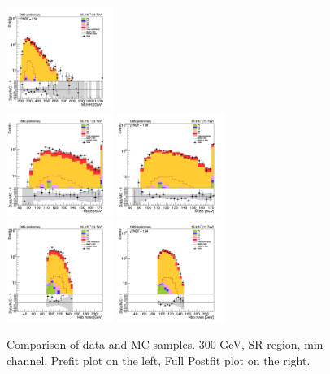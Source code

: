 \begin{figure}[tbp]
\begin{center}
    \includegraphics[width=0.31\textwidth]{figures/mm_300_SR_april21/hhMt_mm_SR_FullPostfit_plot_apr21.png}\\
    \includegraphics[width=0.31\textwidth]{figures/mm_300_SR_april21/hmass0_mm_SR_prefit_plot_apr21.png}
    \includegraphics[width=0.31\textwidth]{figures/mm_300_SR_april21/hmass0_mm_SR_FullPostfit_plot_apr21.png}\\
    \includegraphics[width=0.31\textwidth]{figures/mm_300_SR_april21/hmass1_mm_SR_prefit_plot_apr21.png}
    \includegraphics[width=0.31\textwidth]{figures/mm_300_SR_april21/hmass1_mm_SR_FullPostfit_plot_apr21.png}\\
    \caption{Comparison of data and MC samples. 300 GeV, SR region, mm channel. Prefit plot on the left,           Full Postfit plot on the right.}
    \label{fig:MCcomparisons_mm_low_SR}
  \end{center}
\end{figure}

